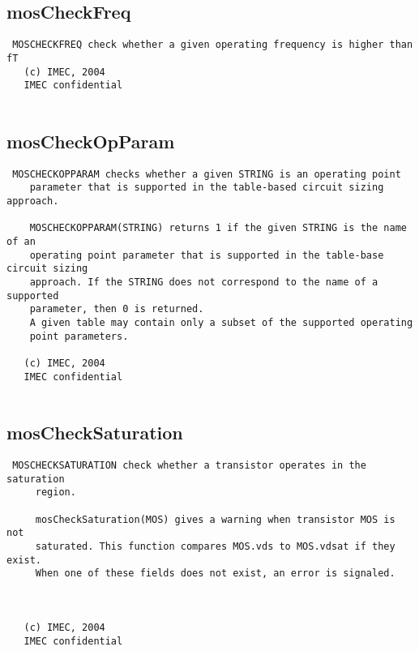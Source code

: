 \newpage
\subsection{mosCheckFreq}
\label{sec:mosCheckFreq}
\begin{verbatim}
 MOSCHECKFREQ check whether a given operating frequency is higher than fT
   (c) IMEC, 2004
   IMEC confidential 
 

\end{verbatim}

\newpage
\subsection{mosCheckOpParam}
\label{sec:mosCheckOpParam}
\begin{verbatim}
 MOSCHECKOPPARAM checks whether a given STRING is an operating point
    parameter that is supported in the table-based circuit sizing approach.
 
    MOSCHECKOPPARAM(STRING) returns 1 if the given STRING is the name of an 
    operating point parameter that is supported in the table-base circuit sizing
    approach. If the STRING does not correspond to the name of a supported
    parameter, then 0 is returned.
    A given table may contain only a subset of the supported operating
    point parameters.
 
   (c) IMEC, 2004
   IMEC confidential 
 

\end{verbatim}

\newpage
\subsection{mosCheckSaturation}
\label{sec:mosCheckSaturation}
\begin{verbatim}
 MOSCHECKSATURATION check whether a transistor operates in the saturation
     region.
 
     mosCheckSaturation(MOS) gives a warning when transistor MOS is not
     saturated. This function compares MOS.vds to MOS.vdsat if they exist.
     When one of these fields does not exist, an error is signaled.
 
 
 
   (c) IMEC, 2004
   IMEC confidential 
 

\end{verbatim}

